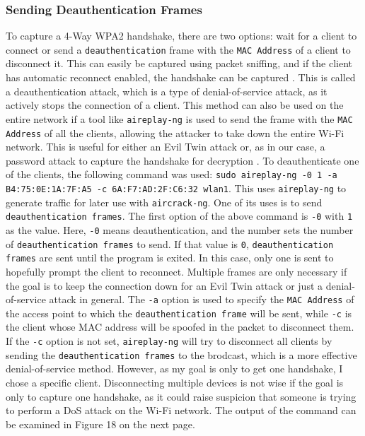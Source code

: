 \documentclass[a4paper]{article}
\begin{document}
\subsubsection{Sending Deauthentication Frames}
To capture a 4-Way WPA2 handshake, there are two options: wait for a client to connect or send a \texttt{deauthentication} frame with the \texttt{MAC Address} of a client to disconnect it. This can easily be captured using packet sniffing, and if the client has automatic reconnect enabled, the handshake can be captured \cite{noauthor_wi-fi_2025}. \nl
This is called a deauthentication attack, which is a type of denial-of-service attack, as it actively stops the connection of a client. This method can also be used on the entire network if a tool like \texttt{aireplay-ng} is used to send the frame with the \texttt{MAC Address} of all the clients, allowing the attacker to take down the entire Wi-Fi network. This is useful for either an Evil Twin attack or, as in our case, a password attack to capture the handshake for decryption \cite{noauthor_wi-fi_2025, noauthor_aireplay-ng_nodate}. \nl
To deauthenticate one of the clients, the following command was used:\nl
\texttt{sudo aireplay-ng -0 1 -a B4:75:0E:1A:7F:A5 -c 6A:F7:AD:2F:C6:32 wlan1}.\nl
This uses \texttt{aireplay-ng} to generate traffic for later use with \texttt{aircrack-ng}. One of its uses is to send \texttt{deauthentication frames}. The first option of the above command is \texttt{-0} with \texttt{1} as the value. Here, \texttt{-0} means deauthentication, and the number sets the number of \texttt{deauthentication frames} to send. If that value is \texttt{0}, \texttt{deauthentication frames} are sent until the program is exited. In this case, only one is sent to hopefully prompt the client to reconnect. Multiple frames are only necessary if the goal is to keep the connection down for an Evil Twin attack or just a denial-of-service attack in general. The \texttt{-a} option is used to specify the \texttt{MAC Address} of the access point to which the \texttt{deauthentication frame} will be sent, while \texttt{-c} is the client whose MAC address will be spoofed in the packet to disconnect them. If the \texttt{-c} option is not set, \texttt{aireplay-ng} will try to disconnect all clients by sending the \texttt{deauthentication frames} to the brodcast, which is a more effective denial-of-service method. However, as my goal is only to get one handshake, I chose a specific client. Disconnecting multiple devices is not wise if the goal is only to capture one handshake, as it could raise suspicion that someone is trying to perform a DoS attack on the Wi-Fi network. The output of the command can be examined in Figure 18 on the next page. \cite{noauthor_deauthentication_nodate}\newpage
\end{document}

